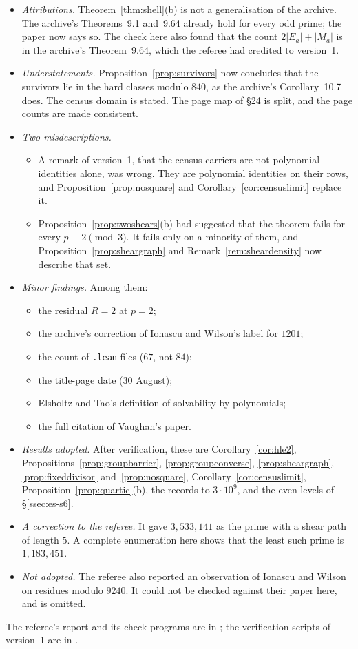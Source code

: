 \begin{itemize}
\item \emph{Attributions.} Theorem~\ref{thm:shell}(b) is not a generalisation of the archive. The archive's Theorems~9.1 and~9.64 already hold for every odd prime; the paper now says so. The check here also found that the count $2|E_a|+|M_a|$ is in the archive's Theorem~9.64, which the referee had credited to version~1.
\item \emph{Understatements.} Proposition~\ref{prop:survivors} now concludes that the survivors lie in the hard classes modulo $840$, as the archive's Corollary~10.7 does. The census domain is stated. The page map of §24 is split, and the page counts are made consistent.
\item \emph{Two misdescriptions.}
\begin{itemize}
\item A remark of version~1, that the census carriers are not polynomial identities alone, was wrong. They are polynomial identities on their rows, and Proposition~\ref{prop:nosquare} and Corollary~\ref{cor:censuslimit} replace it.
\item Proposition~\ref{prop:twoshears}(b) had suggested that the theorem fails for every $p\equiv2\pmod3$. It fails only on a minority of them, and Proposition~\ref{prop:sheargraph} and Remark~\ref{rem:sheardensity} now describe that set.
\end{itemize}
\item \emph{Minor findings.} Among them:
\begin{itemize}
\item the residual $R=2$ at $p=2$;
\item the archive's correction of Ionascu and Wilson's label for $1201$;
\item the count of \texttt{.lean} files ($67$, not $84$);
\item the title-page date ($30$ August);
\item Elsholtz and Tao's definition of solvability by polynomials;
\item the full citation of Vaughan's paper.
\end{itemize}
\item \emph{Results adopted.} After verification, these are Corollary~\ref{cor:hle2}, Propositions~\ref{prop:groupbarrier}, \ref{prop:groupconverse}, \ref{prop:sheargraph}, \ref{prop:fixeddivisor} and~\ref{prop:nosquare}, Corollary~\ref{cor:censuslimit}, Proposition~\ref{prop:quartic}(b), the records to $3\cdot10^9$, and the even levels of §\ref{ssec:es-s6}.
\item \emph{A correction to the referee.} It gave $3{,}533{,}141$ as the prime with a shear path of length $5$. A complete enumeration here shows that the least such prime is $1{,}183{,}451$.
\item \emph{Not adopted.} The referee also reported an observation of Ionascu and Wilson on residues modulo $9240$. It could not be checked against their paper here, and is omitted.
\end{itemize}
The referee's report and its check programs are in ; the verification scripts of version~1 are in .

